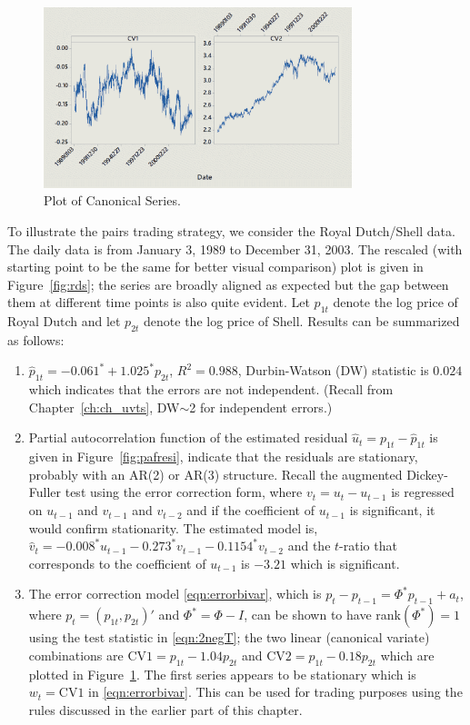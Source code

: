 	\begin{figure}[!ht]
	\centering
	\includegraphics[width=0.8\textwidth]{chapters/chapter_stat_ts/figures/can.png}
	\caption{Plot of Canonical Series. \label{fig:can}}
	\end{figure}


To illustrate the pairs trading strategy, we consider the Royal Dutch/Shell data. The daily data is from January 3, 1989 to December 31, 2003. The rescaled (with starting point to be the same for better visual comparison) plot is given in Figure~\ref{fig:rds}; the series are broadly aligned as expected but the gap between them at different time points is also quite evident. Let $p_{1t}$ denote the log price of Royal Dutch and let $p_{2t}$ denote the log price of Shell. Results can be summarized as follows:

\begin{enumerate}[--]
\item $\hat{p}_{1t}= -0.061^* + 1.025^* p_{2t}$, $R^2=0.988$, Durbin-Watson (DW) statistic is $0.024$ which indicates that the errors are not independent. (Recall from Chapter~\ref{ch:ch_uvts}, DW$\sim$2 for independent errors.)

\item Partial autocorrelation function of the estimated residual $\hat{u}_t= p_{1t} - \hat{p}_{1t}$ is given in Figure~\ref{fig:pafresi}, indicate that the residuals are stationary, probably with an AR(2) or AR(3) structure. Recall the augmented Dickey-Fuller test using the error correction form, where $v_t= u_t - u_{t-1}$ is regressed on $u_{t-1}$ and $v_{t-1}$ and $v_{t-2}$ and if the coefficient of $u_{t-1}$ is significant, it would confirm stationarity. The estimated model is, $\hat{v}_t= -0.008^* u_{t-1} - 0.273^* v_{t-1} - 0.1154^* v_{t-2}$ and the $t$-ratio that corresponds to the coefficient of $u_{t-1}$ is $-3.21$ which is significant. 

\item The error correction model \eqref{eqn:errorbivar}, which is $p_t - p_{t-1}= \Phi^* p_{t-1} + a_t$, where $p_t= (p_{1t}, p_{2t})'$ and $\Phi^* = \Phi-I$, can be shown to have rank$(\Phi^*)=1$ using the test statistic in \eqref{eqn:2negT}; the two linear (canonical variate) combinations are $\text{CV1}= p_{1t} - 1.04 p_{2t}$ and $\text{CV2}= p_{1t} - 0.18 p_{2t}$ which are plotted in Figure~\ref{fig:can}. The first series appears to be stationary which is $w_t= \text{CV1}$ in \eqref{eqn:errorbivar}. This can be used for trading purposes using the rules discussed in the earlier part of this chapter. 
\end{enumerate}


